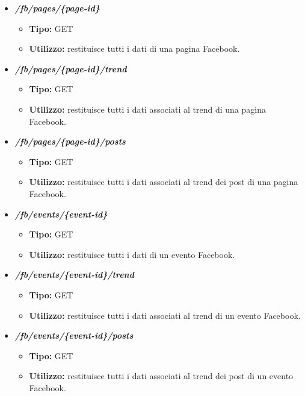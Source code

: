 \begin{itemize}
  \item \textit{\textbf{/fb/pages/\{page-id\}}}
  \begin{itemize}
    \item \textbf{Tipo:} GET
    \item \textbf{Utilizzo:} restituisce tutti i dati di una pagina Facebook.
  \end{itemize}
  \item \textit{\textbf{/fb/pages/\{page-id\}/trend}}
  \begin{itemize}
    \item \textbf{Tipo:} GET
    \item \textbf{Utilizzo:} restituisce tutti i dati associati al trend di una pagina Facebook.
  \end{itemize}
  \item \textit{\textbf{/fb/pages/\{page-id\}/posts}}
  \begin{itemize}
    \item \textbf{Tipo:} GET
    \item \textbf{Utilizzo:} restituisce tutti i dati associati al trend dei post di una pagina Facebook.
  \end{itemize}
  \item \textit{\textbf{/fb/events/\{event-id\}}}
  \begin{itemize}
    \item \textbf{Tipo:} GET
    \item \textbf{Utilizzo:} restituisce tutti i dati di un evento Facebook.
  \end{itemize}
  \item \textit{\textbf{/fb/events/\{event-id\}/trend}}
  \begin{itemize}
    \item \textbf{Tipo:} GET
    \item \textbf{Utilizzo:} restituisce tutti i dati associati al trend di un evento Facebook.
  \end{itemize}
  \item \textit{\textbf{/fb/events/\{event-id\}/posts}}
  \begin{itemize}
    \item \textbf{Tipo:} GET
    \item \textbf{Utilizzo:} restituisce tutti i dati associati al trend dei post di un evento Facebook.
  \end{itemize}


\end{itemize}
